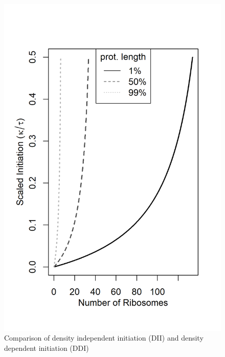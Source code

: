\documentclass[review]{elsarticle}
\begin{document}
\begin{figure}[ht]
\centering
\includegraphics[width=\textwidth/2]{Images/TE_linear_DDI_not_scaled_for_imax.png}
\caption{Comparison of density independent initiation (DII) and density dependent initiation (DDI)}
\end{figure}
\end{document}
